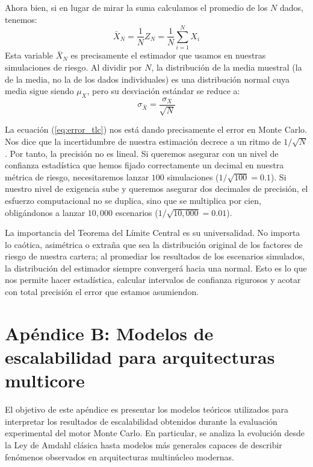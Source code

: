 \documentclass[11pt]{article}
\begin{document}
Ahora bien, si en lugar de mirar la suma calculamos el promedio de los $N$ dados, tenemos:
\begin{equation}
    \bar{X}_N = \frac{1}{N} Z_N = \frac{1}{N} \sum_{i=1}^{N} X_i
\end{equation}
Esta variable $\bar{X}_N$ es precisamente el estimador que usamos en nuestras simulaciones de riesgo. Al dividir por $N$, la distribución de la media muestral (la de la media, no la de los dados individuales) es una distribución normal cuya media sigue siendo $\mu_X$, pero su desviación estándar se reduce a:
\begin{equation}
    \sigma_{\bar{X}} = \frac{\sigma_X}{\sqrt{N}}
    \label{eq:error_tlc}
\end{equation}

La ecuación (\ref{eq:error_tlc}) nos está dando precisamente el error en Monte Carlo. Nos dice que la incertidumbre de nuestra estimación decrece a un ritmo de $1/\sqrt{N}$. Por tanto, la precisión no es lineal. Si queremos asegurar con un nivel de confianza estadística que hemos fijado correctamente un decimal en nuestra métrica de riesgo, necesitaremos lanzar $100$ simulaciones ($1/\sqrt{100} = 0.1$). Si nuestro nivel de exigencia sube y queremos asegurar dos decimales de precisión, el esfuerzo computacional no se duplica, sino que se multiplica por cien, obligándonos a lanzar $10,000$ escenarios ($1/\sqrt{10,000} = 0.01$).

La importancia del Teorema del Límite Central es su universalidad. No importa lo caótica, asimétrica o extraña que sea la distribución original de los factores de riesgo de nuestra cartera; al promediar los resultados de los escenarios simulados, la distribución del estimador siempre convergerá hacia una normal. Esto es lo que nos permite hacer estadística, calcular intervalos de confianza rigurosos y acotar con total precisión el error que estamos asumiendon.

\newpage

\section*{Apéndice B: Modelos de escalabilidad para arquitecturas multicore}
\label{ap:escalabilidad_smt}

El objetivo de este apéndice es presentar los modelos teóricos utilizados para interpretar los resultados de escalabilidad obtenidos durante la evaluación experimental del motor Monte Carlo. En particular, se analiza la evolución desde la Ley de Amdahl clásica hasta modelos más generales capaces de describir fenómenos observados en arquitecturas multinúcleo modernas.
\end{document}
